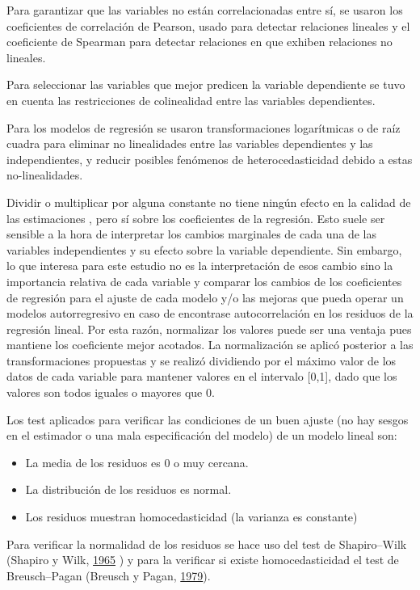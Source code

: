 \documentclass[12pt,a4paper,openany]{book}
\providecommand{\tightlist}{%
  \setlength{\itemsep}{0pt}\setlength{\parskip}{0pt}}
\theoremstyle{definition}
\theoremstyle{definition}
\theoremstyle{definition}
\theoremstyle{remark}
\begin{document}
Para garantizar que las variables no están correlacionadas entre sí, se
usaron los coeficientes de correlación de Pearson, usado para detectar
relaciones lineales y el coeficiente de Spearman para detectar
relaciones en que exhiben relaciones no lineales.

Para seleccionar las variables que mejor predicen la variable
dependiente se tuvo en cuenta las restricciones de colinealidad entre
las variables dependientes.

Para los modelos de regresión se usaron transformaciones logarítmicas o
de raíz cuadra para eliminar no linealidades entre las variables
dependientes y las independientes, y reducir posibles fenómenos de
heterocedasticidad debido a estas no-linealidades.

Dividir o multiplicar por alguna constante no tiene ningún efecto en la
calidad de las estimaciones , pero sí sobre los coeficientes de la
regresión. Esto suele ser sensible a la hora de interpretar los cambios
marginales de cada una de las variables independientes y su efecto sobre
la variable dependiente. Sin embargo, lo que interesa para este estudio
no es la interpretación de esos cambio sino la importancia relativa de
cada variable y comparar los cambios de los coeficientes de regresión
para el ajuste de cada modelo y/o las mejoras que pueda operar un
modelos autorregresivo en caso de encontrase autocorrelación en los
residuos de la regresión lineal. Por esta razón, normalizar los valores
puede ser una ventaja pues mantiene los coeficiente mejor acotados. La
normalización se aplicó posterior a las transformaciones propuestas y se
realizó dividiendo por el máximo valor de los datos de cada variable
para mantener valores en el intervalo {[}0,1{]}, dado que los valores
son todos iguales o mayores que 0.

Los test aplicados para verificar las condiciones de un buen ajuste (no
hay sesgos en el estimador o una mala especificación del modelo) de un
modelo lineal son:

\begin{itemize}
\tightlist
\item
  La media de los residuos es 0 o muy cercana.
\item
  La distribución de los residuos es normal.
\item
  Los residuos muestran homocedasticidad (la varianza es constante)
\end{itemize}

Para verificar la normalidad de los residuos se hace uso del test de
Shapiro--Wilk (Shapiro y Wilk,
\protect\hyperlink{ref-shapiro1965analysis}{1965} ) y para la verificar
si existe homocedasticidad el test de Breusch--Pagan (Breusch y Pagan,
\protect\hyperlink{ref-breusch1979simple}{1979}).
\end{document}
